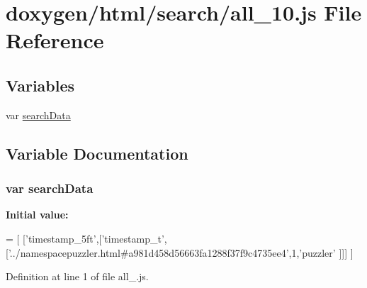 \hypertarget{a00042}{}\section{doxygen/html/search/all\+\_\+10.js File Reference}
\label{a00042}
\subsection*{Variables}
\begin{DoxyCompactItemize}
\item 
var \hyperlink{a00042_ad01a7523f103d6242ef9b0451861231e}{search\+Data}
\end{DoxyCompactItemize}


\subsection{Variable Documentation}
\hypertarget{a00042_ad01a7523f103d6242ef9b0451861231e}{}
\subsubsection[{search\+Data}]{\setlength{\rightskip}{0pt plus 5cm}var search\+Data}\label{a00042_ad01a7523f103d6242ef9b0451861231e}
{\bfseries Initial value\+:}
\begin{DoxyCode}
=
[
  [\textcolor{stringliteral}{'timestamp\_5ft'},[\textcolor{stringliteral}{'timestamp\_t'},[\textcolor{stringliteral}{'../namespacepuzzler.html#a981d458d56663fa1288f37f9c4735ee4'},1,\textcolor{stringliteral}{'puzzler'}
      ]]]
]
\end{DoxyCode}


Definition at line 1 of file all\+\_.\+js.

